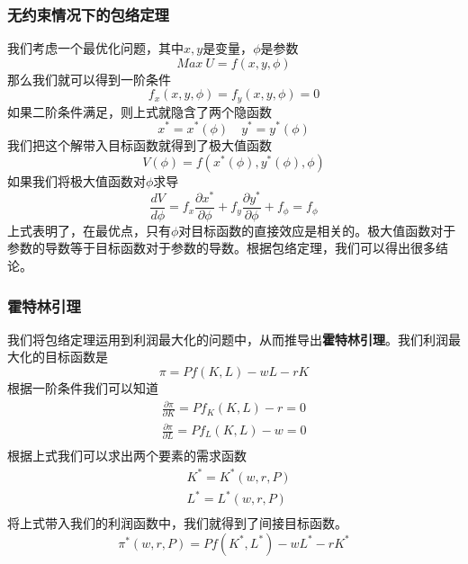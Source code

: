 \documentclass[UTF8,12pt]{ctexart}
\numberwithin{equation}{section} %
\numberwithin{figure}{section}
\numberwithin{table}{section}
\begin{document}
	\subsubsection{无约束情况下的包络定理}
	我们考虑一个最优化问题，其中$x,y$是变量，$\phi$是参数
	\begin{equation}
		Max \ U = f(x,y,\phi)
	\end{equation}
	那么我们就可以得到一阶条件
	\begin{equation}
		f_x(x,y,\phi) = f_y(x,y,\phi) = 0
	\end{equation}
	如果二阶条件满足，则上式就隐含了两个隐函数
	\begin{equation}
		x^* = x^*(\phi) \quad y^* = y^*(\phi)
	\end{equation}
	我们把这个解带入目标函数就得到了极大值函数
	\begin{equation}
		V(\phi) = f(x^*(\phi),y^*(\phi),\phi)
	\end{equation}
	如果我们将极大值函数对$\phi$求导
	\begin{equation}
		\frac{dV}{d\phi} = f_{x}\frac{\partial x^*}{\partial \phi} + f_{y}\frac{\partial y^*}{\partial \phi} + f_{\phi} = f_{\phi}
	\end{equation}
	上式表明了，在最优点，只有$\phi$对目标函数的直接效应是相关的。极大值函数对于参数的导数等于目标函数对于参数的导数。根据包络定理，我们可以得出很多结论。
	
	\subsubsection{霍特林引理}
	
	我们将包络定理运用到利润最大化的问题中，从而推导出\textbf{霍特林引理}。我们利润最大化的目标函数是
	\begin{equation}
		\pi = Pf(K,L) - wL - rK
	\end{equation}
	根据一阶条件我们可以知道
	\begin{equation}
		\begin{aligned}
			\frac{\partial \pi}{\partial K} = Pf_K(K,L) - r = 0 \\
			\frac{\partial \pi}{\partial L} = Pf_L(K,L) - w = 0 \\
		\end{aligned}
	\end{equation}
	根据上式我们可以求出两个要素的需求函数
	\begin{equation}
		\begin{aligned}
			&K^* = K^*(w,r,P) \\
			&L^* = L^*(w,r,P) \\
		\end{aligned}
	\end{equation}
	将上式带入我们的利润函数中，我们就得到了间接目标函数。
	\begin{equation}
		\pi^*(w,r,P) = Pf(K^*,L^*) - wL^* - rK^*
	\end{equation}
	
\end{document}

